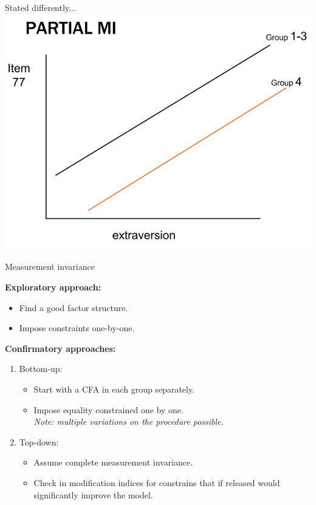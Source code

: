 \documentclass[10pt]{beamer}\usepackage[]{graphicx}\usepackage[]{xcolor}
\begin{document}
\begin{frame}{Stated differently...}
    \includegraphics[height=0.8\textheight,keepaspectratio]{images/slide116.png}
\end{frame}
%
%
\begin{frame}[fragile]{Measurement invariance}

\textbf{Exploratory approach:}
    \begin{itemize}
        \item Find a good factor structure.
        \item Impose constraints one-by-one.
    \end{itemize}
\vspace{5mm}
\textbf{Confirmatory approaches:}  
    \begin{enumerate}
        \item Bottom-up:
        \begin{itemize}
            \item Start with a CFA in each group separately.
            \item Impose equality constrained one by one. \\
            \textit{Note: multiple variations on the procedure possible.}
        \end{itemize}
        \item Top-down:
        \begin{itemize}
            \item Assume complete measurement invariance.
            \item Check in modification indices for constrains that if released would significantly improve the model.
        \end{itemize}
    \end{enumerate}
    
\end{frame}
\end{document}
